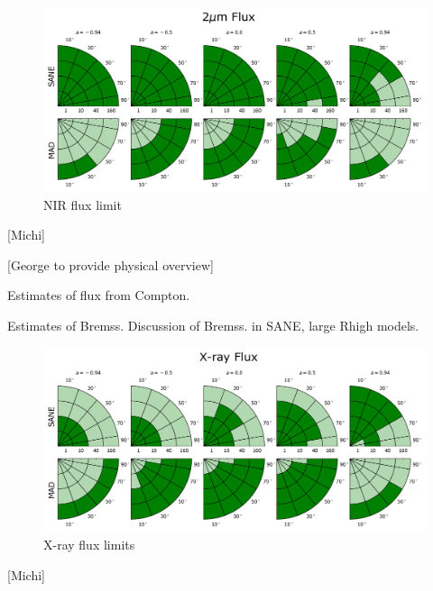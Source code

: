 
\begin{figure}
  \centering
  \includegraphics[width=\columnwidth]{./figures/2um_flux_Constraints.png}
  \caption{NIR flux limit}
  \label{fig:cmp_2um_flux}
\end{figure}

[Michi]


[George to provide physical overview]

Estimates of flux from Compton.

Estimates of Bremss.  Discussion of Bremss. in SANE, large Rhigh models.

\begin{figure}
  \centering
  \includegraphics[width=\columnwidth]{./figures/Xray_flux_Constraints.png}
  \caption{X-ray flux limits}
  \label{fig:cmp_xray_flux}
\end{figure}

[Michi]


